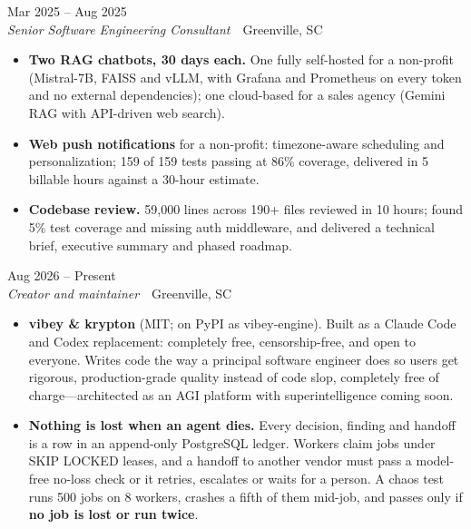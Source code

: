 \documentclass[10pt,letterpaper]{article}
\newcommand{\szmeta}{\fontsize{8pt}{10pt}\selectfont}
\begin{document}
\vspace{3pt}
 \hfill {\color{muted}\szmeta Mar 2025 – Aug 2025}\\[1pt]
{\itshape Senior Software Engineering Consultant}{\color{muted}\ \textbullet\ Greenville, SC}
\vspace{2pt}
\begin{itemize}
\item \textbf{Two RAG chatbots, 30 days each.} One fully self-hosted for a non-profit (Mistral-7B, FAISS and vLLM, with Grafana and Prometheus on every token and no external dependencies); one cloud-based for a sales agency (Gemini RAG with API-driven web search).
\item \textbf{Web push notifications} for a non-profit: timezone-aware scheduling and personalization; 159 of 159 tests passing at 86\% coverage, delivered in 5 billable hours against a 30-hour estimate.
\item \textbf{Codebase review.} 59,000 lines across 190+ files reviewed in 10 hours; found 5\% test coverage and missing auth middleware, and delivered a technical brief, executive summary and phased roadmap.
\end{itemize}
\vspace{3pt}
 \hfill {\color{muted}\szmeta Aug 2026 – Present}\\[1pt]
{\itshape Creator and maintainer}{\color{muted}\ \textbullet\ Greenville, SC}
\vspace{2pt}
\begin{itemize}
\item \textbf{vibey \& krypton} {\color{muted}(MIT; on PyPI as vibey-engine)}. Built as a Claude Code and Codex replacement: completely free, censorship-free, and open to everyone. Writes code the way a principal software engineer does so users get rigorous, production-grade quality instead of code slop, completely free of charge—architected as an AGI platform with superintelligence coming soon.
\item \textbf{Nothing is lost when an agent dies.} Every decision, finding and handoff is a row in an append-only PostgreSQL ledger. Workers claim jobs under SKIP LOCKED leases, and a handoff to another vendor must pass a model-free no-loss check or it retries, escalates or waits for a person. A chaos test runs 500 jobs on 8 workers, crashes a fifth of them mid-job, and passes only if \textbf{no job is lost or run twice}.
\end{itemize}
\end{document}
